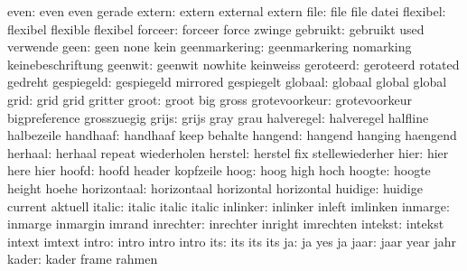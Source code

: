                even:  even                 even                gerade
             extern:  extern               external            extern
               file:  file                 file                datei
           flexibel:  flexibel             flexible            flexibel
            forceer:  forceer              force               zwinge
           gebruikt:  gebruikt             used                verwende
               geen:  geen                 none                kein
      geenmarkering:  geenmarkering        nomarking           keinebeschriftung
            geenwit:  geenwit              nowhite             keinweiss
          geroteerd:  geroteerd            rotated             gedreht
         gespiegeld:  gespiegeld           mirrored            gespiegelt
            globaal:  globaal              global              global
               grid:  grid                 grid                gritter
              groot:  groot                big                 gross
      grotevoorkeur:  grotevoorkeur        bigpreference       grosszuegig
              grijs:  grijs                gray                grau
         halveregel:  halveregel           halfline            halbezeile
           handhaaf:  handhaaf             keep                behalte
            hangend:  hangend              hanging             haengend
            herhaal:  herhaal              repeat              wiederholen
            herstel:  herstel              fix                 stellewiederher
               hier:  hier                 here                hier
              hoofd:  hoofd                header              kopfzeile
               hoog:  hoog                 high                hoch
             hoogte:  hoogte               height              hoehe
        horizontaal:  horizontaal          horizontal          horizontal
            huidige:  huidige              current             aktuell
             italic:  italic               italic              italic 
           inlinker:  inlinker             inleft              imlinken
            inmarge:  inmarge              inmargin            imrand
          inrechter:  inrechter            inright             imrechten
            intekst:  intekst              intext              imtext
              intro:  intro                intro               intro
                its:  its                  its                 its
                 ja:  ja                   yes                 ja
               jaar:  jaar                 year                jahr
              kader:  kader                frame               rahmen
